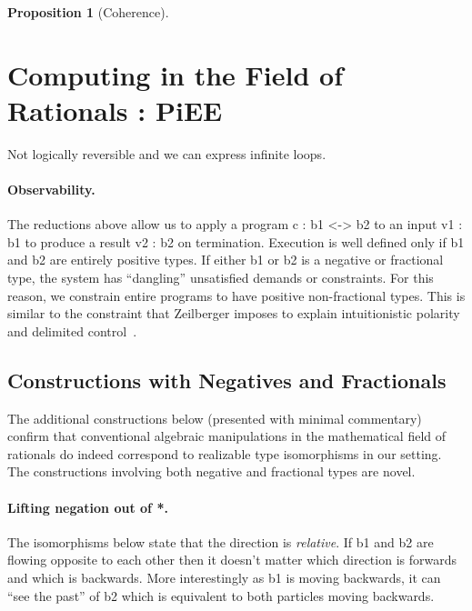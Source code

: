 \documentclass[preprint]{sigplanconf}
\newtheorem{proposition}[theorem]{Proposition}
\begin{document}
\begin{proposition}[Coherence]
  
\end{proposition}



\section{Computing in the Field of Rationals : {{PiEE}} }

Not logically reversible and we can express infinite loops.


\paragraph*{Observability.} 

The reductions above allow us to apply a program {{c : b1 <-> b2}} to an
input {{v1 : b1}} to produce a result {{v2 : b2}} on termination. Execution
is well defined only if {{b1}} and {{b2}} are entirely positive types. If
either {{b1}} or {{b2}} is a negative or fractional type, the system has
``dangling'' unsatisfied demands or constraints. For this reason, we
constrain entire programs to have positive non-fractional types. This is
similar to the constraint that Zeilberger imposes to explain intuitionistic
polarity and delimited control~\cite{10.1109/LICS.2010.23}.

\subsection{Constructions with Negatives and Fractionals}
\label{sec:specific-constructions}

The additional constructions below (presented with minimal commentary)
confirm that conventional algebraic manipulations in the mathematical field
of rationals do indeed correspond to realizable type isomorphisms in our
setting. The constructions involving both negative and fractional types are
novel.

\paragraph*{Lifting negation out of {{*}}.}
The isomorphisms below state that the direction is \emph{relative}. If {{b1}}
and {{b2}} are flowing opposite to each other then it doesn't matter which
direction is forwards and which is backwards. More interestingly as {{b1}} is
moving backwards, it can ``see the past'' of {{b2}} which is equivalent to
both particles moving backwards.
\end{document}
